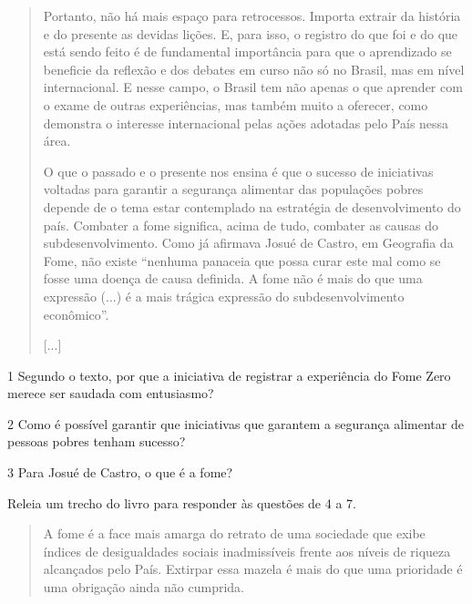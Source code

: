 \begin{quote}
Portanto, não há mais espaço para retrocessos. Importa extrair da
história e do presente as devidas lições. E, para isso, o registro do
que foi e do que está sendo feito é de fundamental importância para que
o aprendizado se beneficie da reflexão e dos debates em curso não só no
Brasil, mas em nível internacional. E nesse campo, o Brasil tem não
apenas o que aprender com o exame de outras experiências, mas também
muito a oferecer, como demonstra o interesse internacional pelas ações
adotadas pelo País nessa área.

O que o passado e o presente nos ensina é que o sucesso de iniciativas
voltadas para garantir a segurança alimentar das populações pobres
depende de o tema estar contemplado na estratégia de desenvolvimento do
país. Combater a fome significa, acima de tudo, combater as causas do
subdesenvolvimento. Como já afirmava Josué de Castro, em Geografia da
Fome, não existe ``nenhuma panaceia que possa curar este mal como se
fosse uma doença de causa definida. A fome não é mais do que uma
expressão (...) é a mais trágica expressão do subdesenvolvimento
econômico''.

{[}...{]}

\end{quote}

\num{1} Segundo o texto, por que a iniciativa de registrar a experiência
do Fome Zero merece ser saudada com entusiasmo? 


\num{2} Como é possível garantir que iniciativas que garantem a
segurança alimentar de pessoas pobres tenham sucesso? 


\num{3} Para Josué de Castro, o que é a fome? 


Releia um trecho do livro para responder às questões de 4 a 7.

\begin{quote}
A fome é a face mais amarga do retrato de uma sociedade que exibe
índices de desigualdades sociais inadmissíveis frente aos níveis de
riqueza alcançados pelo País. Extirpar essa mazela é mais do que uma
prioridade é uma obrigação ainda não cumprida.
\end{quote}

